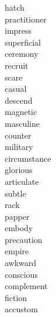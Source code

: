 \documentclass[a4paper, 10pt]{ctexart}
\begin{document}
\begin{multicols*}{2}
\begin{description}
\item[hatch]

\item[practitioner]

\item[impress]

\item[superficial]

\item[ceremony]

\item[recruit]

\item[scare]

\item[casual]

\item[descend]

\item[magnetic]

\item[masculine]

\item[counter]

\item[military]

\item[circumstance]

\item[glorious]

\item[articulate]

\item[subtle]

\item[rack]

\item[papper]

\item[embody]

\item[precaution]

\item[empire]

\item[awkward]

\item[conscious]

\item[complement]

\item[fiction]

\item[accustom]


\end{description}
\end{multicols*}
\end{document}
